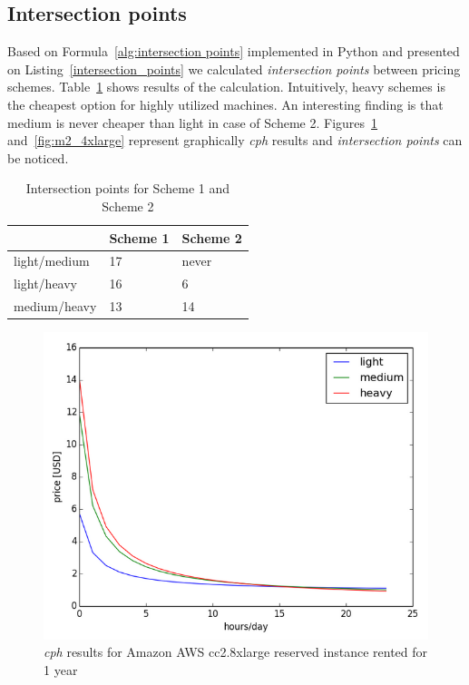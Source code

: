 \documentclass[]{final_report}
\begin{document}
\subsection{Intersection points}

Based on Formula~\ref{alg:intersection points} implemented in Python and presented on Listing~\ref{intersection_points} we calculated \textit{intersection points} between pricing schemes. Table~\ref{tab:intersection_points} shows results of the calculation. Intuitively, heavy schemes is the cheapest option for highly utilized machines. An interesting finding is that medium is never cheaper than light in case of Scheme 2. Figures~\ref{fig:cc2_8xlarge} and~\ref{fig:m2_4xlarge} represent graphically \textit{cph} results and \textit{intersection points} can be noticed.

\begin{table}[h]
\begin{center}
    \begin{tabular}{| l | l | l |}
    \hline
    & \textbf{Scheme 1} & \textbf{Scheme 2} \\
    \hline
    light/medium & 17 & never \\
    \hline
    light/heavy & 16 & 6 \\
    \hline
    medium/heavy & 13 & 14 \\
    \hline
    \end{tabular}
\end{center}
\caption{Intersection points for Scheme 1 and Scheme 2}
\label{tab:intersection_points}
\end{table}

\begin{figure}[H]
  \includegraphics[width=\linewidth]{figures/cc2_8xlarge}
  \caption{\textit{cph} results for Amazon AWS cc2.8xlarge reserved instance rented for 1 year~\cite{AWS:light}~\cite{AWS:medium}~\cite{AWS:heavy}}
  \label{fig:cc2_8xlarge}
\end{figure}
\end{document}
